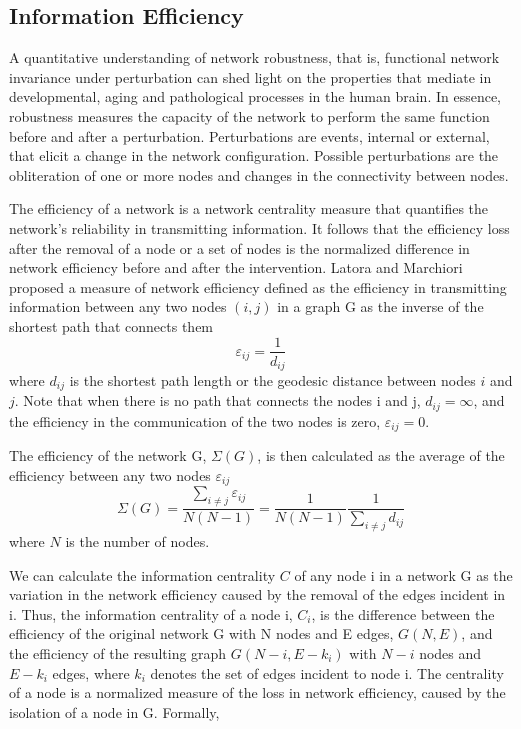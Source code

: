 \documentclass[12pt,a4paper]{article}
\begin{document}
\subsection{Information Efficiency}
\label{ss:nrobeffvul}
A quantitative understanding of network robustness, that is, functional
network invariance under perturbation can shed light on 
the properties that mediate in developmental, aging and pathological processes
in the human brain. In essence, robustness measures the capacity of the network to
perform the same function before and after a perturbation. Perturbations are
events, internal or external, that elicit a change in the network
configuration. Possible perturbations are the obliteration of one or more nodes and changes in the
connectivity between nodes. 

The efficiency of a network is a network centrality
measure that quantifies the network's reliability in transmitting information. It follows that the  efficiency loss after the removal of a
node or a set of nodes is the normalized difference in network efficiency before and after the intervention.
Latora and Marchiori \cite{latora_efficient_2001} proposed a measure of network
efficiency defined as the efficiency in transmitting information 
between any two nodes $(i,j)$ in a graph G as the inverse of the shortest path that
connects them
\begin{equation}
\varepsilon_{ij}= \frac{1} {d_{ij}}
\label{eq:geod}
\end{equation}
where $d_{ij}$ is the
shortest path length or the geodesic distance between nodes $i$ and $j$. 
Note that when there is no path that connects the nodes i and j, $d_{ij}=
\infty$, and the efficiency in the communication of the two nodes is zero,
$\varepsilon_{ij}=0$.

The efficiency of the network G, $\Sigma(G)$, is then calculated as the average of the efficiency
between any two nodes $\varepsilon_{ij}$ 
\begin{equation}
\Sigma(G)=\frac{\sum_{i \neq j} \varepsilon_{ij}} {N(N-1)}
=\frac{1}{N(N-1)}\frac{1}{\sum_{i \neq j } d_{ij}}
\label{eq:latm}
\end{equation}
where $N$ is the number of nodes. 
 
We can calculate
the information centrality $C$ of any node i in a network G as the variation
in the network efficiency caused by the removal of the edges incident in i. Thus, the
information centrality of a node i, $C_i$, is the difference between the
efficiency of the original network G with N nodes and E edges, $G(N,E)$, and the
efficiency of the resulting graph $G(N-i,E-k_i)$ with $N-i$ nodes and $E-k_i$ edges, where
$k_i$ denotes the set of edges incident to node i. The centrality of a
node is a normalized measure of the loss in network efficiency, caused by the isolation of a node in G. Formally,
\end{document}
